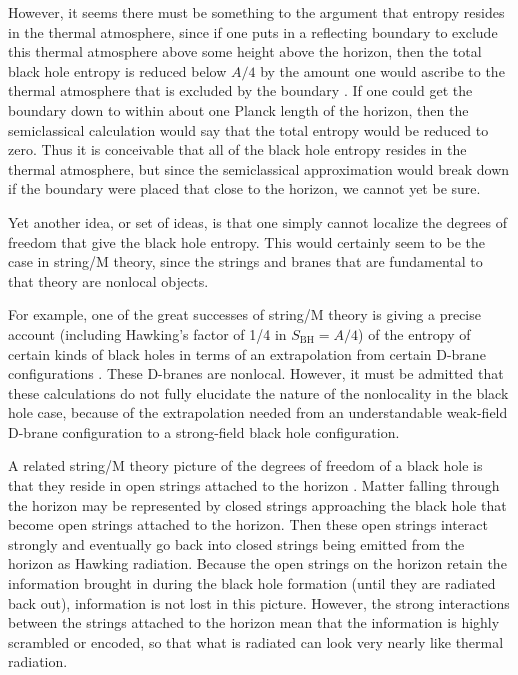 \documentclass[12pt]{article} \usepackage{latexsym}
\begin{document}
However, it seems there must be something to the argument that entropy
resides in the thermal atmosphere, since if one puts in a reflecting
boundary to exclude this thermal atmosphere above some height above
the horizon, then the total black hole entropy is reduced below $A/4$
by the amount one would ascribe to the thermal atmosphere that is
excluded by the boundary \cite{PageA4}.  If one could get the boundary
down to within about one Planck length of the horizon, then the
semiclassical calculation would say that the total entropy would be
reduced to zero.  Thus it is conceivable that all of the black hole
entropy resides in the thermal atmosphere, but since the semiclassical
approximation would break down if the boundary were placed that close
to the horizon, we cannot yet be sure.

Yet another idea, or set of ideas, is that one simply cannot localize
the degrees of freedom that give the black hole entropy.  This would
certainly seem to be the case in string/M theory, since the strings
and branes that are fundamental to that theory are nonlocal objects.

For example, one of the great successes of string/M theory is giving a
precise account (including Hawking's factor of 1/4 in $S_{\mathrm{BH}}
= A/4$) of the entropy of certain kinds of black holes in terms of an
extrapolation from certain D-brane configurations
\cite{Sen,SV,CM,HS,BMPV,JKM,MSt,BLMPSV,HMS,DVV,HLM,MSuss,KT,HRS,CT,
Mald,MStrom,HM,PolTASI,HP,MalStr,Vafa,Mald2,BFKS,MSW,SS,MAdSCFT,
Strom,Peet,BSS,Witten,GKS,Sen98,Cvetic98,Witten98,Skenderis99,
Gubser98,AGMOO,Marolf98,Horowitz99,Damour99,Khuri0,Peet0,DM,
Myers1,Khuri1,Mathur4,Thorlacius4,Duff4}.  These D-branes are
nonlocal.  However, it must be admitted that these calculations do not
fully elucidate the nature of the nonlocality in the black hole case,
because of the extrapolation needed from an understandable weak-field
D-brane configuration to a strong-field black hole configuration.

A related string/M theory picture of the degrees of freedom of a black
hole is that they reside in open strings attached to the horizon
\cite{Susskind}.  Matter falling through the horizon may be
represented by closed strings approaching the black hole that become
open strings attached to the horizon.  Then these open strings
interact strongly and eventually go back into closed strings being
emitted from the horizon as Hawking radiation.  Because the open
strings on the horizon retain the information brought in during the
black hole formation (until they are radiated back out), information
is not lost in this picture.  However, the strong interactions between
the strings attached to the horizon mean that the information is
highly scrambled or encoded, so that what is radiated can look very
nearly like thermal radiation.
\end{document}
